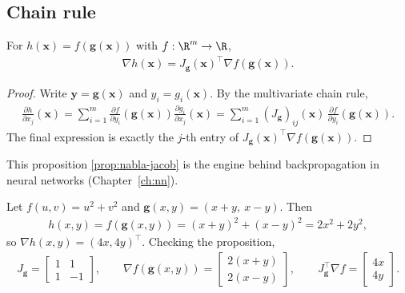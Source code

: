 \documentclass[a4paper, 12pt]{book}
\begin{document}
\subsection{Chain rule}
\begin{proposition}\label{prop:nabla-jacob}
    For $h(\mathbf{x}) = f(\mathbf{g}(\mathbf{x}))$ with $f : \R^m \to \R$,
\begin{align}
    \nabla h(\mathbf{x}) = J_{\mathbf{g}}(\mathbf{x})^\top \nabla f(\mathbf{g}(\mathbf{x})).
\end{align}
\end{proposition}
\begin{proof}
    Write $\mathbf{y}=\mathbf{g}(\mathbf{x})$ and $y_i=g_i(\mathbf{x})$. By the
    multivariate chain rule,
    \begin{align}
        \frac{\partial h}{\partial x_j}(\mathbf{x})
        = \sum_{i=1}^m
          \frac{\partial f}{\partial y_i}(\mathbf{g}(\mathbf{x}))
          \frac{\partial g_i}{\partial x_j}(\mathbf{x})
        = \sum_{i=1}^m
          (J_{\mathbf{g}})_{ij}(\mathbf{x})\,
          \frac{\partial f}{\partial y_i}(\mathbf{g}(\mathbf{x})).
    \end{align}
    The final expression is exactly the $j$-th entry of
    $J_{\mathbf{g}}(\mathbf{x})^\top\nabla f(\mathbf{g}(\mathbf{x}))$.
\end{proof}
This proposition \ref{prop:nabla-jacob} is the engine behind backpropagation in neural networks
(Chapter~\ref{ch:nn}).
\begin{example}
    Let $f(u,v)=u^2+v^2$ and $\mathbf{g}(x,y)=(x+y,\ x-y)$. Then
    \begin{align}
        h(x,y) = f(\mathbf{g}(x,y)) = (x+y)^2+(x-y)^2 = 2x^2+2y^2,
    \end{align}
    so $\nabla h(x,y)=(4x,4y)^\top$. Checking the proposition,
    \begin{align}
        J_{\mathbf{g}} = \begin{bmatrix}1&1\\1&-1\end{bmatrix},
        \qquad
        \nabla f(\mathbf{g}(x,y)) = \begin{bmatrix}2(x+y)\\2(x-y)\end{bmatrix},
        \qquad
        J_{\mathbf{g}}^\top\nabla f = \begin{bmatrix}4x\\4y\end{bmatrix}.
    \end{align}
\end{example}
\end{document}
